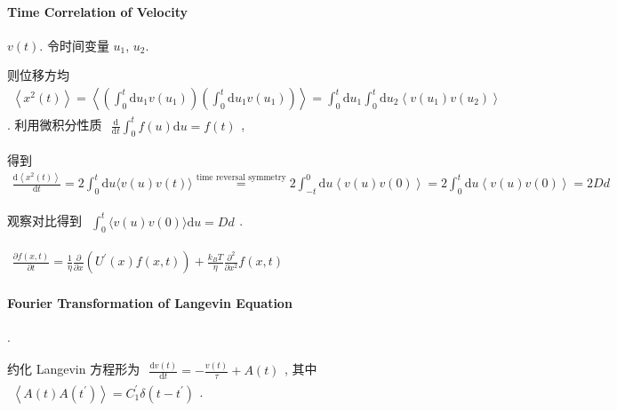 \documentclass[../../main.tex]{subfiles}
\begin{document}
\paragraph{Time Correlation of Velocity} $v(t)$. 令时间变量 $u_{1}$, $u_{2}$. 

则位移方均 $\begin{aligned}
    \left\langle x^{2}(t)\right\rangle = \left\langle
        \left(\int_{0}^{t}\mathrm{d}u_{1}v(u_{1})\right)
        \left(\int_{0}^{t}\mathrm{d}u_{1}v(u_{1})\right)
    \right\rangle = \int_{0}^{t}\mathrm{d}u_{1}\int_{0}^{t}\mathrm{d}u_{2}\left\langle v(u_{1})v(u_{2})\right\rangle
\end{aligned}$. 利用微积分性质 $\begin{aligned}
    \frac{\mathrm{d}}{\mathrm{d}t} \int_{0}^{t}f(u)\mathrm{d}u = f(t)
\end{aligned}$, 

得到 $\begin{aligned}
    \frac{\mathrm{d}\left\langle x^{2}(t)\right\rangle}{\mathrm{d}t} = 2\int_{0}^{t}\mathrm{d}u \langle v(u)v(t)\rangle \stackrel{\text{time reversal symmetry}}{=} 2\int_{-t}^{0}\mathrm{d}u \left\langle v(u)v(0)\right\rangle = 2\int_{0}^{t}\mathrm{d}u \left\langle v(u)v(0)\right\rangle = 2Dd
\end{aligned}$

观察对比得到 $\begin{aligned}
    \int_{0}^{t}\langle v(u)v(0)\rangle\mathrm{d}u = Dd
\end{aligned}$. 

$\begin{aligned}
    \frac{\partial f(x,t)}{\partial t} = \frac{1}{\eta}\frac{\partial}{\partial x}(U^{\prime}(x)f(x,t)) + \frac{k_{B}T}{\eta}\frac{\partial^{2}}{\partial x^{2}}f(x,t)
\end{aligned}$

\paragraph{Fourier Transformation of Langevin Equation}.

约化 Langevin 方程形为 $\begin{aligned}
    \frac{\mathrm{d}v(t)}{\mathrm{d}t} = -\frac{v(t)}{\tau} + A(t)
\end{aligned}$, 其中 $\begin{aligned}
    \left\langle A(t)A\left(t^{\prime}\right)\right\rangle = C_{1}^{\prime}\delta\left(t-t^{\prime}\right)
\end{aligned}$. 
\end{document}

